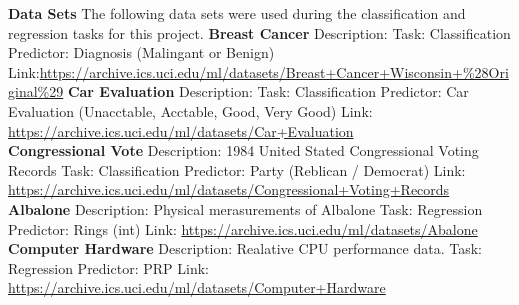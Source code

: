 \documentclass[twoside,11pt]{article}
\begin{document}
\newpage
{\noindent}{\bf Data Sets}\newline
The following data sets were used during the classification and regression tasks for this project.\newline
{\bf Breast Cancer}\newline
Description: \newline
Task: Classification\newline
Predictor: Diagnosis (Malingant or Benign)\newline
Link:\newline \url{https://archive.ics.uci.edu/ml/datasets/Breast+Cancer+Wisconsin+%28Original%29}\newline
{\noindent}\textbf{Car Evaluation}\newline
Description:\newline
Task: Classification\newline
Predictor: Car Evaluation (Unacctable, Acctable, Good, Very Good)\newline
Link: \newline
\url{https://archive.ics.uci.edu/ml/datasets/Car+Evaluation}\\
{\noindent}\textbf{Congressional Vote}\newline
Description: 1984 United Stated Congressional Voting Records\newline
Task: Classification \newline
Predictor: Party (Reblican / Democrat) \newline
Link: \newline
\url{https://archive.ics.uci.edu/ml/datasets/Congressional+Voting+Records}\newline
{\noindent}\textbf{Albalone}\newline
Description: Physical merasurements of Albalone\newline
Task: Regression\newline
Predictor: Rings (int)\newline
Link: \newline
\url{https://archive.ics.uci.edu/ml/datasets/Abalone}\newline
{\noindent}\textbf{Computer Hardware}\newline
Description: Realative CPU performance data.\newline
Task: Regression\newline
Predictor: PRP\newline
Link: \newline
\url{https://archive.ics.uci.edu/ml/datasets/Computer+Hardware}\newline
\end{document}
